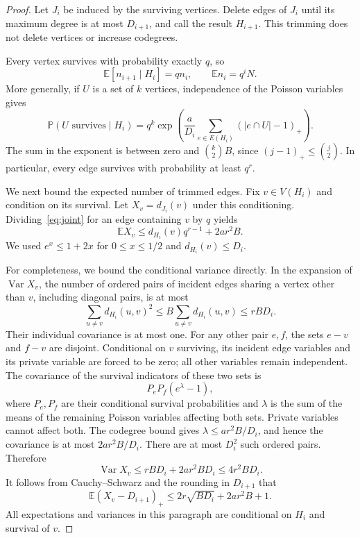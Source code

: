 \documentclass[11pt]{article}
\newcommand{\E}{\mathbb E}
\newcommand{\PP}{\mathbb P}
\newcommand{\pos}[1]{\left(#1\right)_+}
\begin{document}
\begin{proof}
Let $J_i$ be induced by the surviving vertices. Delete edges of $J_i$ until its maximum
 degree is at most $D_{i+1}$, and call the result $H_{i+1}$. This trimming does not
 delete vertices or increase codegrees.

Every vertex survives with probability exactly $q$, so
\begin{equation}\label{eq:survivors}
 \E[n_{i+1}\mid H_i]=qn_i,\qquad \E n_i=q^iN.
\end{equation}
More generally, if $U$ is a set of $k$ vertices, independence of the Poisson variables gives
\begin{equation}\label{eq:joint}
 \PP(U\text{ survives}\mid H_i)
 =q^k\exp\!\left(\frac a{D_i}
  \sum_{e\in E(H_i)}\pos{|e\cap U|-1}\right).
\end{equation}
The sum in the exponent is between zero and $\binom{k}{2}B$, since $(j-1)_+\le\binom
 j2$. In particular, every edge survives with probability at least $q^r$.

We next bound the expected number of trimmed edges. Fix $v\in V(H_i)$ and condition on
 its survival. Let $X_v=d_{J_i}(v)$ under this conditioning. Dividing~\eqref{eq:joint}
 for an edge containing $v$ by $q$ yields
\[
 \E X_v\le d_{H_i}(v)q^{r-1}+2ar^2B.
\]
We used $e^x\le1+2x$ for $0\le x\le1/2$ and $d_{H_i}(v)\le D_i$.

For completeness, we bound the conditional variance directly. In the expansion of
 $\operatorname{Var}X_v$, the number of ordered pairs of incident edges sharing a vertex
 other than $v$, including diagonal pairs, is at most
\[
 \sum_{u\ne v}d_{H_i}(u,v)^2
 \le B\sum_{u\ne v}d_{H_i}(u,v)
 \le rBD_i.
\]
Their individual covariance is at most one. For any other pair $e,f$, the sets $e-v$ and
 $f-v$ are disjoint. Conditional on $v$ surviving, its incident edge variables and its
 private variable are forced to be zero; all other variables remain independent. The
 covariance of the survival indicators of these two sets is
\[
 P_eP_f(e^\lambda-1),
\]
where $P_e,P_f$ are their conditional survival probabilities and $\lambda$ is the sum of
 the means of the remaining Poisson variables affecting both sets. Private variables
 cannot affect both. The codegree bound gives $\lambda\le ar^2B/D_i$, and hence the
 covariance is at most $2ar^2B/D_i$. There are at most $D_i^2$ such ordered pairs.
 Therefore
\[
 \operatorname{Var}X_v\le rBD_i+2ar^2BD_i\le4r^2BD_i.
\]
It follows from Cauchy--Schwarz and the rounding in $D_{i+1}$ that
\[
 \E\pos{X_v-D_{i+1}}
 \le2r\sqrt{BD_i}+2ar^2B+1.
\]
All expectations and variances in this paragraph are conditional on $H_i$ and survival of $v$.


\end{proof}
\end{document}
